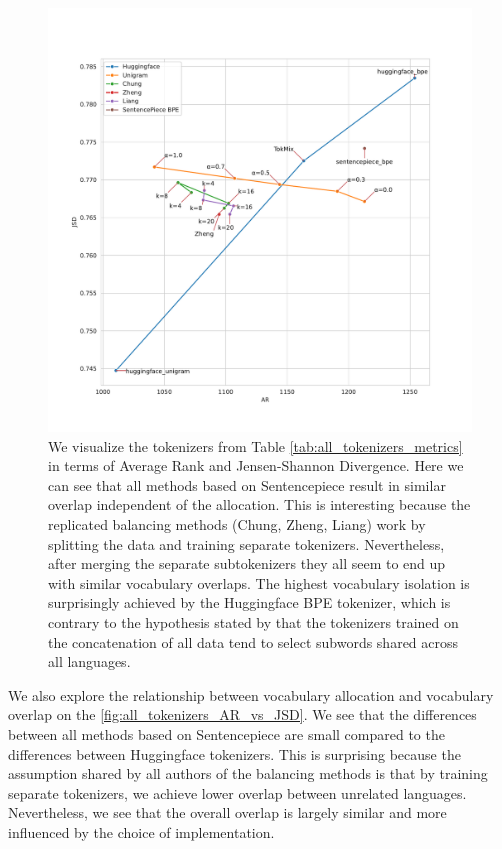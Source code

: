 \begin{figure}
    \centering
    \includegraphics[width=\textwidth]{figures/all_tokenizers_AR_vs_JSD.pdf}
    \caption{We visualize the tokenizers from Table \ref{tab:all_tokenizers_metrics} in terms of Average Rank and Jensen-Shannon Divergence. Here we can see that all methods based on Sentencepiece result in similar overlap independent of the allocation. This is interesting because the replicated balancing methods (Chung, Zheng, Liang) work by splitting the data and training separate tokenizers. Nevertheless, after merging the separate subtokenizers they all seem to end up with similar vocabulary overlaps. The highest vocabulary isolation is surprisingly achieved by the Huggingface BPE tokenizer, which is contrary to the hypothesis stated by \citet{chung_improving_2020,zheng_allocating_2021} that the tokenizers trained on the concatenation of all data tend to select subwords shared across all languages.}
    \label{fig:all_tokenizers_AR_vs_JSD}
\end{figure}

We also explore the relationship between vocabulary allocation and vocabulary overlap on the \autoref{fig:all_tokenizers_AR_vs_JSD}. We see that the differences between all methods based on Sentencepiece are small compared to the differences between Huggingface tokenizers. This is surprising because the assumption shared by all authors of the balancing methods is that by training separate tokenizers, we achieve lower overlap between unrelated languages. Nevertheless, we see that the overall overlap is largely similar and more influenced by the choice of implementation. 

